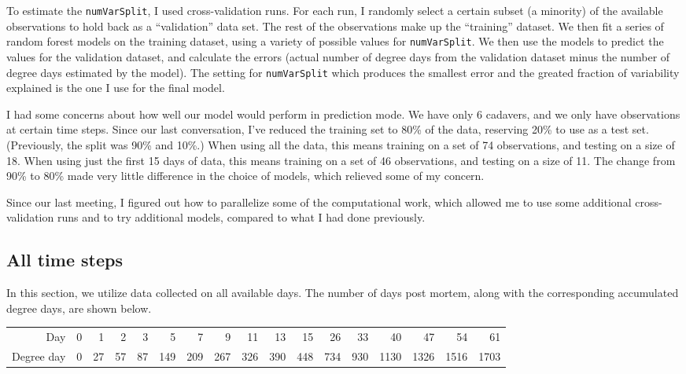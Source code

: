 \documentclass{article}
\begin{document}
To estimate the \texttt{numVarSplit}, I used cross-validation
runs.  For each run, I randomly select a certain subset (a minority)
of the available observations to hold back as a ``validation'' data
set.  The rest of the observations make up the ``training'' dataset.
We then fit a series of random forest models on the training dataset,
using a variety of possible values for \texttt{numVarSplit}.  We then
use the models to predict the values for the validation dataset, and
calculate the errors (actual number of degree days from the validation
dataset minus the number of degree days estimated by the model).  The
setting for \texttt{numVarSplit} which produces the smallest error and
the greated fraction of variability explained is the one I use for the
final model.

I had some concerns about how well our model would perform in
prediction mode.  We have only 6 cadavers, and we only have
observations at certain time steps.  Since our last conversation, I've
reduced the training set to 80\% of the data, reserving 20\% to use as
a test set.  (Previously, the split was 90\% and 10\%.)  When using
all the data, this means training on a set of 74 observations, and
testing on a size of 18.  When using just the first 15 days of data,
this means training on a set of 46 observations, and testing on a size
of 11.  The change from 90\% to 80\% made very little difference in
the choice of models, which relieved some of my concern.

Since our last meeting, I figured out how to parallelize some of the
computational work, which allowed me to use some additional
cross-validation runs and to try additional models, compared to what I
had done previously.



\subsection{All time steps}

In this section, we utilize data collected on all available days.  The
number of days post mortem, along with the corresponding accumulated
degree days, are shown below.

\begin{center}
\begin{tabular}{r|rrrrrrrrrrrrrrrr}
  Day & 0 & 1 & 2 & 3 & 5 & 7 & 9 & 11 & 13 & 15 & 26 & 33 & 40 & 47 & 54 & 61\\
  Degree day & 0 & 27 & 57 & 87 & 149 & 209 & 267 & 326 & 390 & 448 & 734 & 930 & 1130 & 1326 & 1516 & 1703
\end{tabular}
\end{center}
\end{document}
